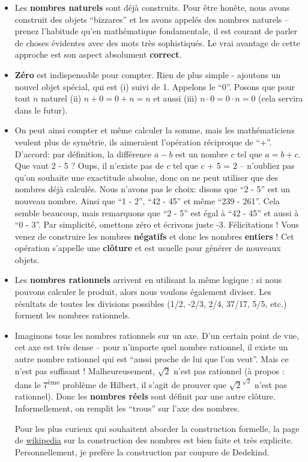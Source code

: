 \documentclass[12pt, a4paper]{article}
\begin{document}
\begin{itemize}
	\item Les \textbf{nombres naturels} sont déjà construits. Pour être honête, nous avons construit des objets ``bizzares'' et les avons appelés des nombres naturels -- prenez l'habitude qu'en mathématique fondamentale, il est courant de parler de choses évidentes avec des mots très sophistiqués. Le vrai avantage de cette approche est son aspect absolument \textbf{correct}.
	\item \textbf{Zéro} est indispensable pour compter. Rien de plus simple - ajoutons un nouvel objet spécial, qui est (i) suivi de 1. Appelons le ``0''. Posons que pour tout $n$ naturel (ii) $n + 0 = 0 + n = n$ et aussi (iii) $n \cdot 0 = 0 \cdot n = 0$ (cela servira dans le futur).
	\item On peut ainsi compter et même calculer la somme, mais les mathématiciens veulent plus de symétrie, ils aimeraient l'opération réciproque de ``+''. D'accord: par définition, la différence $a - b$ est un nombre $c$ tel que $a = b + c$. Que vaut 2 - 5 ? Oups, il n'existe pas de $c$ tel que $c$ + 5 = 2 -- n'oubliez pas qu'on souhaite une exactitude absolue, donc on ne peut utiliser que des nombres déjà calculés. Nous n'avons pas le choix: disons que ``2 - 5'' est un nouveau nombre. Ainsi que ``1 - 2'', ``42 - 45'' et même ``239 - 261''. Cela semble beaucoup, mais remarquons que ``2 - 5'' est égal à ``42 - 45'' et aussi à ``0 - 3''. Par simplicité, omettons zéro et écrivons juste -3. Félicitations ! Vous venez de construire les nombres \textbf{négatifs} et donc les nombres \textbf{entiers} !
	Cet opération s'appelle une \textbf{clôture} et est usuelle pour générer de nouveaux objets.
	\item Les \textbf{nombres rationnels} arrivent en utilisant la même logique : si nous pouvons calculer le produit, alors nous voulons également diviser. Les résultats de toutes les divisions possibles (1/2, -2/3, 2/4, 37/17, 5/5, etc.) forment les nombres rationnels.
	\item Imaginons tous les nombres rationnels sur un axe. D'un certain point de vue, cet axe est très dense -- pour n'importe quel nombre rationnel, il existe un autre nombre rationnel qui est ``aussi proche de lui que l'on veut''. Mais ce n'est pas suffisant ! Malheureusement, $\sqrt{2}$ n'est pas rationnel (à propos : dans le 7\textsuperscript{ème} problème de Hilbert, il s'agit de prouver que $\sqrt2^{\sqrt2}$ n'est pas rationnel).
	Donc les \textbf{nombres réels} sont définit par une autre clôture. Informellement, on remplit les ``trous'' sur l'axe des nombres.

Pour les plus curieux qui souhaitent aborder la construction formelle, la page de
	\href{
		/wiki/Construction_des_nombres_r%
		}{wikipedia} sur la construction des nombres est bien faite et très explicite.
	Personnellement, je prefère la construction par coupure de Dedekind.
\end{itemize}
\end{document}
